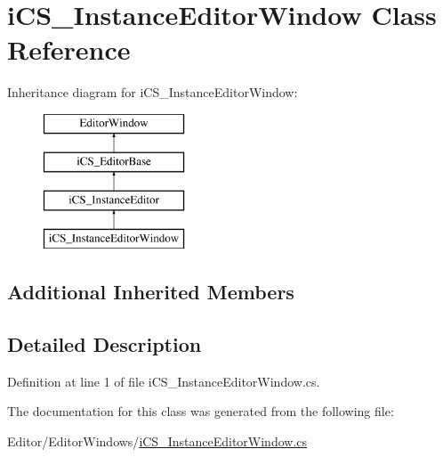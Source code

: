 \hypertarget{classi_c_s___instance_editor_window}{\section{i\+C\+S\+\_\+\+Instance\+Editor\+Window Class Reference}
\label{classi_c_s___instance_editor_window}
}
Inheritance diagram for i\+C\+S\+\_\+\+Instance\+Editor\+Window\+:\begin{figure}[H]
\begin{center}
\leavevmode
\includegraphics[height=4.000000cm]{classi_c_s___instance_editor_window}
\end{center}
\end{figure}
\subsection*{Additional Inherited Members}


\subsection{Detailed Description}


Definition at line 1 of file i\+C\+S\+\_\+\+Instance\+Editor\+Window.\+cs.



The documentation for this class was generated from the following file\+:\begin{DoxyCompactItemize}
\item 
Editor/\+Editor\+Windows/\hyperlink{i_c_s___instance_editor_window_8cs}{i\+C\+S\+\_\+\+Instance\+Editor\+Window.\+cs}\end{DoxyCompactItemize}
